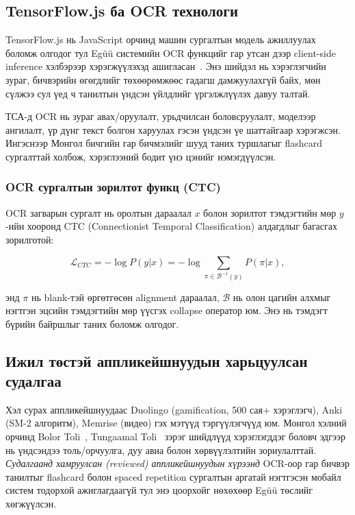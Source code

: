 \subsection{TensorFlow.js ба OCR технологи}
\label{subsec:tensorflow-ocr}

TensorFlow.js нь JavaScript орчинд машин сургалтын модель ажиллуулах боломж олгодог тул Egüü системийн OCR функцийг гар утсан дээр client-side inference хэлбэрээр хэрэгжүүлэхэд ашигласан~\cite{smilkov2019tensorflow}. Энэ шийдэл нь хэрэглэгчийн зураг, бичвэрийн өгөгдлийг төхөөрөмжөөс гадагш дамжуулахгүй байх, мөн сүлжээ сул үед ч танилтын үндсэн үйлдлийг үргэлжлүүлэх давуу талтай.

ТСА-д OCR нь зураг авах/оруулалт, урьдчилсан боловсруулалт, моделээр ангилалт, үр дүнг текст болгон харуулах гэсэн үндсэн үе шаттайгаар хэрэгжсэн. Ингэснээр Монгол бичгийн гар бичмэлийг шууд таних туршлагыг flashcard сургалттай холбож, хэрэглээний бодит үнэ цэнийг нэмэгдүүлсэн.

\subsubsection{OCR сургалтын зорилтот функц (CTC)}

OCR загварын сургалт нь оролтын дараалал $x$ болон зорилтот тэмдэгтийн мөр $y$-ийн хооронд CTC (Connectionist Temporal Classification) алдагдлыг багасгах зорилготой:

\begin{equation}
\mathcal{L}_{CTC} = -\log P(y|x) = -\log \sum_{\pi \in \mathcal{B}^{-1}(y)} P(\pi|x),
\end{equation}

энд $\pi$ нь blank-тэй өргөтгөсөн alignment дараалал, $\mathcal{B}$ нь олон цагийн алхмыг нэгтгэн эцсийн тэмдэгтийн мөр үүсгэх collapse оператор юм. Энэ нь тэмдэгт бүрийн байршлыг таних боломж олгодог.

\subsection{Ижил төстэй аппликейшнуудын харьцуулсан судалгаа}
\label{subsec:comparative-analysis}

Хэл сурах аппликейшнуудаас Duolingo (gamification, 500 сая+ хэрэглэгч), Anki (SM-2 алгоритм), Memrise (видео) гэх мэтүүд тэргүүлэгчүүд юм. Монгол хэлний орчинд Bolor Toli~\cite{bolor-toli}, Tungaamal Toli~\cite{tungaamal-toli} зэрэг шийдлүүд хэрэглэгддэг боловч эдгээр нь үндсэндээ толь/орчуулга, дуу авиа болон хөрвүүлэлтийн зориулалттай. \textit{Судалгаанд хамруулсан (reviewed) аппликейшнуудын хүрээнд} OCR-оор гар бичвэр танилтыг flashcard болон spaced repetition сургалтын аргатай нэгтгэсэн мобайл систем тодорхой ажиглагдаагүй тул энэ цоорхойг нөхөхөөр Egüü төслийг хөгжүүлсэн.

